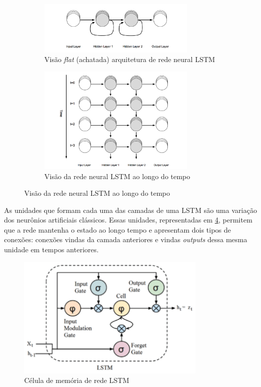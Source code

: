 \begin{figure}[H]
  \centering
  \begin{subfigure}{7.5cm}
      \centering
      \includegraphics[width=7.5cm]{../figuras/redes/arq-rnn-flat.png}
      \caption{Visão \textit{flat} (achatada) arquitetura de rede neural LSTM }
      \label{fig:arq-rnn-flat}
  \end{subfigure}
  \begin{subfigure}{7.5cm}
    \centering
    \includegraphics[width=7.5cm]{../figuras/redes/arq-rnn.png}
    \caption{Visão da rede neural LSTM ao longo do tempo}
    \label{fig:arq-rnnff}
  \end{subfigure}
  \hfill
  \label{fig:comparacao-rnn-flat-normal}
\end{figure}

As unidades que formam cada uma das camadas de uma LSTM são uma variação dos
neurônios artificiais clássicos. Essas unidades, representadas em \ref{fig:lstm-cell},
 permitem que a rede mantenha o estado
ao longo tempo e apresentam dois tipos de 
conexões: conexões vindas da camada anteriores e vindas \textit{outputs} dessa
mesma unidade em tempos anteriores.

\begin{figure}[H]
  \includegraphics[width=9cm]{../figuras/redes/lstm-cell.png}
  \caption{Célula de memória de rede LSTM \cite{deeplearningbook}}
  \label{fig:lstm-cell}
\end{figure}

